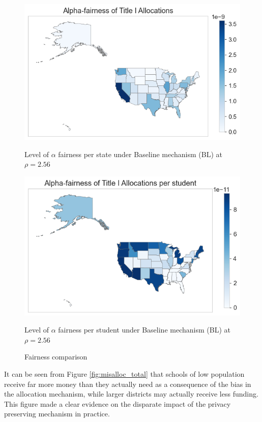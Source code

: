 \begin{figure}[h]
	\centering
	\begin{minipage}[b]{0.45\linewidth}
		\centering
		\includegraphics[width=\linewidth]{images/af_by_state.png}
		\caption{Level of $\alpha$ fairness per state under Baseline mechanism (BL) at $\rho = 2.56$}
		\label{fig:state_alpha}
	\end{minipage}
	\hfill
	\begin{minipage}[b]{0.45\linewidth}
		\centering
		\includegraphics[width=\linewidth]{images/af_by_student.png}
		\caption{Level of $\alpha$ fairness per student under Baseline mechanism (BL) at $\rho = 2.56$}
		\label{fig:student_alpha}
	\end{minipage}
	\caption{Fairness comparison}
	\label{fig:fairness_comparison}
\end{figure}



It can be seen from Figure \ref{fig:misalloc_total} that schools of low population receive far more money than they actually need
as a consequence of the bias in the allocation mechanism, while larger districts may actually receive less funding. This figure made a clear evidence on the disparate impact of the privacy preserving mechanism in practice.


